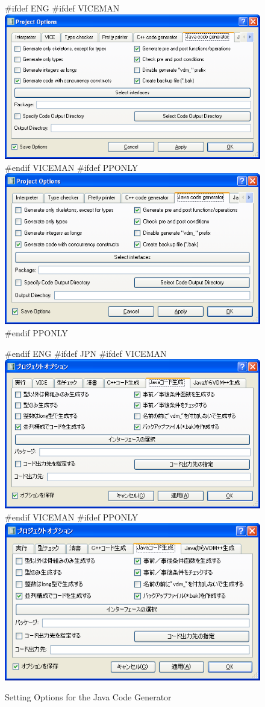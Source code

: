 \documentclass[\pformat,12pt]{article}
\begin{document}
\begin{figure}[tbh]
\begin{center}
#ifdef ENG
#ifdef VICEMAN
\includegraphics[width=12cm]{jcgOptions-viceENG.png}
#endif VICEMAN
#ifdef PPONLY
\includegraphics[width=12cm]{jcgOptions-ppENG.png}
#endif PPONLY
\caption{Setting Options for the Java Code Generator}
#endif ENG
#ifdef JPN
#ifdef VICEMAN
\includegraphics[width=12cm]{jcgOptions-vice.png}
#endif VICEMAN
#ifdef PPONLY
\includegraphics[width=12cm]{jcgOptions-pp.png}

\end{center}
\end{figure}
\end{document}
